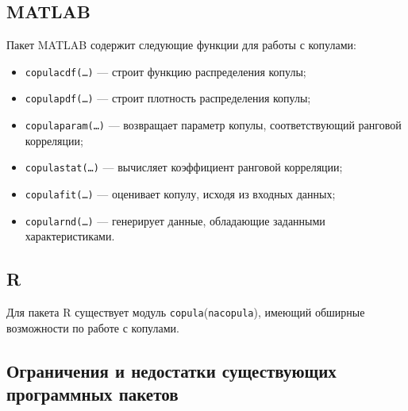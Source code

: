 \subsection*{MATLAB}
Пакет MATLAB содержит следующие функции для работы с копулами:
\begin{itemize}
	\item \texttt{copulacdf(\ldots)} --- строит функцию распределения копулы;
	\item \texttt{copulapdf(\ldots)} --- строит плотность распределения копулы;
	\item \texttt{copulaparam(\ldots)} --- возвращает параметр копулы, соответствующий ранговой корреляции;
	\item \texttt{copulastat(\ldots)} --- вычисляет коэффициент ранговой корреляции;
	\item \texttt{copulafit(\ldots)} --- оценивает копулу, исходя из входных данных;
	\item \texttt{copularnd(\ldots)} --- генерирует данные, обладающие заданными характеристиками.
\end{itemize}

\subsection*{R}
Для пакета R существует модуль \texttt{copula}(\texttt{nacopula}), имеющий обширные возможности \cite{Rcopula} по работе с копулами.

\subsection*{Ограничения и недостатки существующих программных пакетов}

\clearpage
